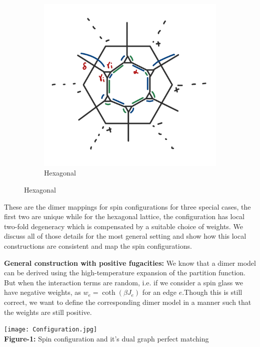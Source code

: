 \documentclass{article}
\begin{document}
\begin{figure}[h]
\begin{subfigure}[b]{0.25\textwidth}
			\includegraphics[width=\textwidth]{Hexagonal.jpg}
			\caption{Hexagonal}
			\label{fig:img2}
		\end{subfigure}
	\end{figure}
	
	These are the dimer mappings for spin configurations for three special cases, the first two are unique while for the hexagonal lattice, the configuration has local two-fold degeneracy which is compensated by a suitable choice of weights.  We discuss all of those details for the most general setting and show how this local constructions are consistent and map the spin configurations. \\
	
	\pagebreak
	
	\textbf{General construction with positive fugacities:} We know that a dimer model can be derived using the high-temperature expansion of the partition function. But when the interaction terms are random, i.e. if we consider a spin glass we have negative weights, as $w_e=\coth(\beta J_e)$ for an edge $e$.Though this is still correct, we want to define the corresponding dimer model in a manner such that the weights are still positive. \\
	
	\begin{center}
		\texttt{[image: Configuration.jpg]}\\
		\textbf{Figure-1:} Spin configuration and it's dual graph perfect matching
	\end{center}
	
\end{document}
